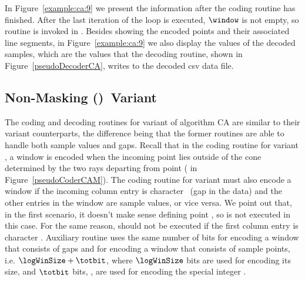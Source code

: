 \vspace{+5pt}


\clearpage


In Figure~\ref{example:ca:9} we present the information after the coding routine has finished. After the last iteration of the loop is executed, $\window$ is not empty, so routine \CAWinEnd is invoked in . Besides showing the encoded points and their associated line segments, in Figure~\ref{example:ca:9} we also display the values of the decoded samples, which are the values that the decoding routine, shown in Figure~\ref{pseudoDecoderCA}, writes to the decoded csv data file. 


\vspace{+5pt}




\vspace{-10pt}
\subsection{Non-Masking (\NOmaskalgo)\ Variant}
\label{algo:ca:nmvariant}


The coding and decoding routines for variant \NOmaskalgo of algorithm CA are similar to their variant \maskalgo counterparts, the difference being that the former routines are able to handle both sample values and gaps. Recall that in the coding routine for variant \maskalgo, a window is encoded when the incoming point lies outside of the cone determined by the two rays departing from point \archived ( in Figure~\ref{pseudoCoderCAM}). The coding routine for variant \NOmaskalgo must also encode a window if the incoming column entry is character \noData\ (gap in the data) and the other entries in the window are sample values, or vice versa. We point out that, in the first scenario, it doesn't make sense defining point \archived, so  is not executed in this case. For the same reason,  should not be executed if the first column entry is character \noData. Auxiliary routine \CAWinEnd uses the same number of bits for encoding a window that consists of gaps and for encoding a window that consists of sample points, i.e. $\logWinSize+\totbit$, where $\logWinSize$ bits are used for encoding its size, and $\totbit$ bits, \wheretotbit, are used for encoding the special integer \nodata. 

